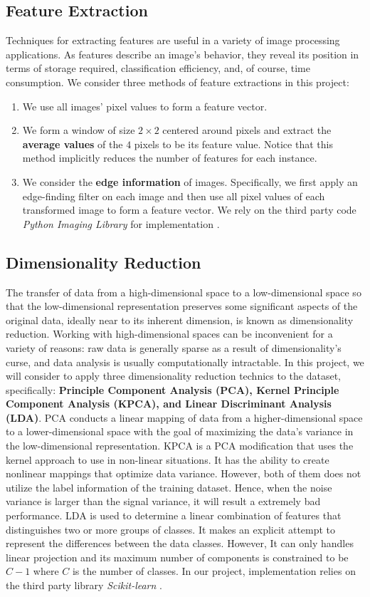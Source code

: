 \documentclass{article}
\begin{document}
\subsection{Feature Extraction} \label{feature}
Techniques for extracting features are useful in a variety of image processing applications. As features describe an image's behavior, they reveal its position in terms of storage required, classification efficiency, and, of course, time consumption. We consider three methods of feature extractions in this project:
\begin{enumerate}
    \item We use all images' pixel values to form a feature vector.
    \item We form a window of size $2\times2$ centered around pixels and extract the \textbf{average values} of the $4$ pixels to be its feature value. Notice that this method implicitly reduces the number of features for each instance.
    \item We consider the \textbf{edge information} of images. Specifically, we first apply an edge-finding filter on each image and then use all pixel values of each transformed image to form a feature vector. We rely on the third party code \emph{Python Imaging Library} for implementation \cite{PIL}.
\end{enumerate}
\subsection{Dimensionality Reduction}
The transfer of data from a high-dimensional space to a low-dimensional space so that the low-dimensional representation preserves some significant aspects of the original data, ideally near to its inherent dimension, is known as dimensionality reduction. Working with high-dimensional spaces can be inconvenient for a variety of reasons: raw data is generally sparse as a result of dimensionality's curse, and data analysis is usually computationally intractable. In this project, we will consider to apply three dimensionality reduction technics to the dataset, specifically: \textbf{Principle Component Analysis (PCA), Kernel Principle Component Analysis (KPCA), and Linear Discriminant Analysis (LDA)}.
PCA conducts a linear mapping of data from a higher-dimensional space to a lower-dimensional space with the goal of maximizing the data's variance in the low-dimensional representation. KPCA is a PCA modification that uses the kernel approach to use in non-linear situations. It has the ability to create nonlinear mappings that optimize data variance. However, both of them does not utilize the label information of the training dataset. Hence, when the noise variance is larger than the signal variance, it will result a extremely bad performance. LDA is used to determine a linear combination of features that distinguishes two or more groups of classes. It makes an explicit attempt to represent the differences between the data classes. However, It can only handles linear projection and its maximum number of components is constrained to be $C-1$ where $C$ is the number of classes. In our project, implementation relies on the third party library \emph{Scikit-learn} \cite{pedregosa2011scikit}.
\end{document}

